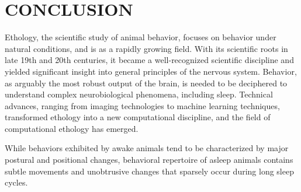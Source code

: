 \setlength{\parindent}{0pt}
\chapter{\bf CONCLUSION}\label{chapter:conclusion}

Ethology, the scientific study of animal behavior, focuses on behavior under natural conditions, and is as a rapidly growing field.
With its scientific roots in late 19th and 20th centuries, it became a well-recognized scientific discipline and yielded significant insight into general principles of the nervous system.
Behavior, as arguably the most robust output of the brain, is needed to be deciphered to understand complex neurobiological phenomena, including sleep.
Technical advances, ranging from imaging technologies to machine learning techniques, transformed ethology into a new computational discipline, and the field of computational ethology has emerged.

While behaviors exhibited by awake animals tend to be characterized by major postural and positional changes, behavioral repertoire of asleep animals contains subtle movements and unobtrusive changes that sparsely occur during long sleep cycles.




